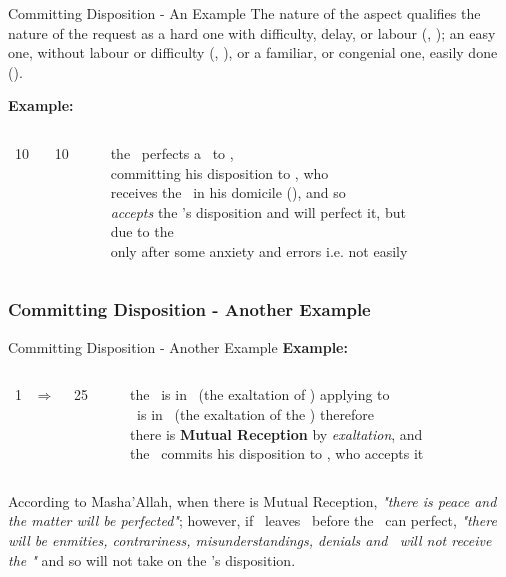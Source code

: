 \begin{frame}[t]{Committing Disposition - An Example}
The nature of the aspect qualifies the nature of the request as a hard one with difficulty, delay, or labour (\Square, \Opposition); an easy one, without labour or difficulty (\Sextile, \Trine), or a familiar, or congenial one, easily done (\Conjunction).

\textbf{Example:}
\begin{columns}[T, onlytextwidth]
\Sun\ 10 \Aries\ \Square\ \Mars\ 10 \Capricorn

\rule{.1mm}{.27\textheight}

the \Sun\ perfects a \Square\  to \Mars, \\
committing his disposition to \Mars, who  \\
receives the \Sun\ in his domicile (\Aries), and so \\
\textsl{accepts} the \Sun's disposition and will perfect it, but \\
due to the \Square\, \\ 
only after some anxiety and errors i.e. not easily
\end{columns}
\end{frame}
\subsubsection{Committing Disposition - Another Example}
\begin{frame}[t]{Committing Disposition - Another Example}
\textbf{Example:}\footnotemark[1]
\begin{columns}[T, onlytextwidth]
\Sun\ 1 \Libra\ $\Rightarrow$ \Opposition\ \Saturn\ 25 \Aries

\rule{.1mm}{.20\textheight}

the \Sun\ is in \Libra\ (the exaltation of \Saturn) applying to \Opposition\ \Saturn \\
\Saturn\ is in \Aries\ (the exaltation of the \Sun) therefore \\
there is \textbf{Mutual Reception} by \textsl{exaltation}, and \\
the \Sun\ commits his disposition to \Saturn, who accepts it
\end{columns}
\vspace{0.25cm}
According to Masha'Allah, when there is Mutual Reception, \textsl{"there is peace and the matter will be perfected"}; however, if \Saturn\ leaves \Aries\ before the \Opposition\ can perfect, \textsl{"there will be enmities, contrariness, misunderstandings, denials and \Saturn\ will not receive the \Sun"} and so will not take on the \Sun's disposition.

\end{frame}
